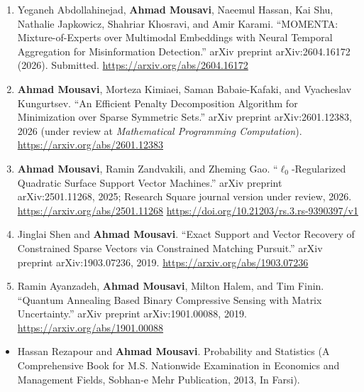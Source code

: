 \documentclass[letterpaper,11pt]{article}
\newcommand{\resheading}[1]{\par\vspace{0.6em}\noindent{\large\textbf{#1}}\par\vspace{0.25em}}
\begin{document}
\begin{enumerate}
\item[7.]
Yeganeh Abdollahinejad, \textbf{Ahmad Mousavi}, Naeemul Hassan, Kai Shu, Nathalie Japkowicz, Shahriar Khosravi, and Amir Karami. ``MOMENTA: Mixture-of-Experts over Multimodal Embeddings with Neural Temporal Aggregation for Misinformation Detection.'' arXiv preprint arXiv:2604.16172 (2026). Submitted.
\url{https://arxiv.org/abs/2604.16172}

\item[5.] \textbf{Ahmad Mousavi}, Morteza Kimiaei, Saman Babaie-Kafaki, and Vyacheslav Kungurtsev. ``An Efficient Penalty Decomposition Algorithm for Minimization over Sparse Symmetric Sets.'' arXiv preprint arXiv:2601.12383, 2026 (under review at \textit{Mathematical Programming Computation}). \url{https://arxiv.org/abs/2601.12383}

\item[4.] \textbf{Ahmad Mousavi}, Ramin Zandvakili, and Zheming Gao. ``$\ell_0$-Regularized Quadratic Surface Support Vector Machines.'' arXiv preprint arXiv:2501.11268, 2025; Research Square journal version under review, 2026. \url{https://arxiv.org/abs/2501.11268} \url{https://doi.org/10.21203/rs.3.rs-9390397/v1}

\item[2.] Jinglai Shen and \textbf{Ahmad Mousavi}. ``Exact Support and Vector Recovery of Constrained Sparse Vectors via Constrained Matching Pursuit.'' arXiv preprint arXiv:1903.07236, 2019. \url{https://arxiv.org/abs/1903.07236}

\item[1.] Ramin Ayanzadeh, \textbf{Ahmad Mousavi}, Milton Halem, and Tim Finin. ``Quantum Annealing Based Binary Compressive Sensing with Matrix Uncertainty.'' arXiv preprint arXiv:1901.00088, 2019. \url{https://arxiv.org/abs/1901.00088}
\end{enumerate}

\resheading{\LARGE{Books}}

\begin{itemize}
\item { Hassan Rezapour and \textbf{Ahmad Mousavi}}.
Probability and Statistics (A Comprehensive Book for M.S. Nationwide Examination in Economics and Management Fields, Sobhan-e Mehr Publication, 2013, In Farsi).

\end{itemize}
\end{document}
